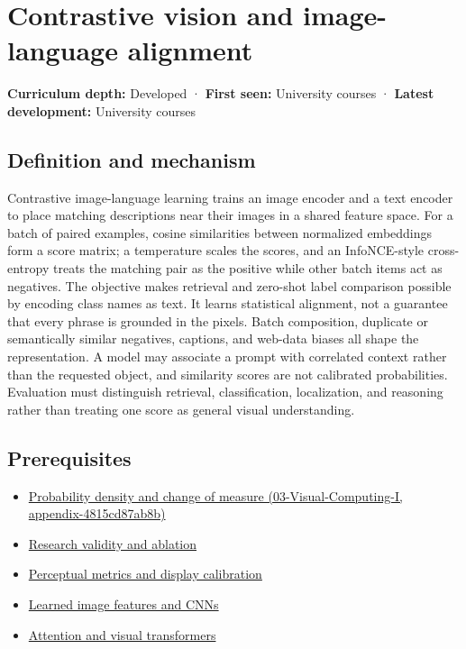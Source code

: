 \hypertarget{appendix-772f1fd96148}{}
\section{Contrastive vision and image-language alignment}\label{appendix-772f1fd96148-contrastive-vision-and-image-language-alignment}

\textbf{Curriculum depth:} Developed · \textbf{First seen:} University courses · \textbf{Latest development:} University courses

\subsection{Definition and mechanism}\label{appendix-772f1fd96148-definition-and-mechanism}

Contrastive image-language learning trains an image encoder and a text encoder to place matching descriptions near their images in a shared feature space. For a batch of paired examples, cosine similarities between normalized embeddings form a score matrix; a temperature scales the scores, and an InfoNCE-style cross-entropy treats the matching pair as the positive while other batch items act as negatives. The objective makes retrieval and zero-shot label comparison possible by encoding class names as text. It learns statistical alignment, not a guarantee that every phrase is grounded in the pixels. Batch composition, duplicate or semantically similar negatives, captions, and web-data biases all shape the representation. A model may associate a prompt with correlated context rather than the requested object, and similarity scores are not calibrated probabilities. Evaluation must distinguish retrieval, classification, localization, and reasoning rather than treating one score as general visual understanding.

\subsection{Prerequisites}\label{appendix-772f1fd96148-prerequisites}

\begin{itemize}
\tightlist
\item
  \href{../03-Visual-Computing-I/main.pdf\#nameddest=appendix-4815cd87ab8b}{Probability density and change of measure (03-Visual-Computing-I, appendix-4815cd87ab8b)}
\item
  \hyperref[appendix-65788587ef78]{Research validity and ablation}
\item
  \hyperref[appendix-b2c1846508bf]{Perceptual metrics and display calibration}
\item
  \hyperref[appendix-47c51ea026fb]{Learned image features and CNNs}
\item
  \hyperref[appendix-a9d5dfdd164a]{Attention and visual transformers}
\end{itemize}

